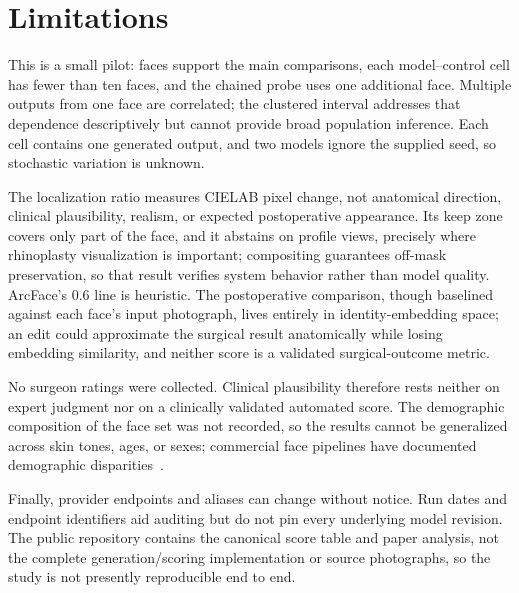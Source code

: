 \section{Limitations}
\label{sec:limitations}

This is a small pilot: \NumPrimaryFaces{} faces support the main comparisons,
each model--control cell has fewer than ten faces, and the chained probe uses one
additional face. Multiple outputs from one face are correlated; the clustered
interval addresses that dependence descriptively but cannot provide broad
population inference. Each cell contains one generated output, and two models
ignore the supplied seed, so stochastic variation is unknown.

The localization ratio measures CIELAB pixel change, not anatomical direction,
clinical plausibility, realism, or expected postoperative appearance. Its keep
zone covers only part of the face, and it abstains on profile views, precisely
where rhinoplasty visualization is important; compositing guarantees off-mask
preservation, so that result verifies system behavior rather than model quality.
ArcFace's 0.6 line is heuristic. The postoperative comparison, though baselined
against each face's input photograph, lives entirely in identity-embedding
space; an edit could approximate the surgical result anatomically while losing
embedding similarity, and neither score is a validated surgical-outcome metric.

No surgeon ratings were collected. Clinical plausibility therefore rests neither
on expert judgment nor on a clinically validated automated score. The demographic
composition of the face set was not recorded, so the results cannot be generalized
across skin tones, ages, or sexes; commercial face pipelines have documented
demographic disparities~\cite{buolamwini2018gendershades}.

Finally, provider endpoints and aliases can change without notice. Run dates and
endpoint identifiers aid auditing but do not pin every underlying model revision.
The public repository contains the canonical score table and paper analysis, not
the complete generation/scoring implementation or source photographs, so the
study is not presently reproducible end to end.
